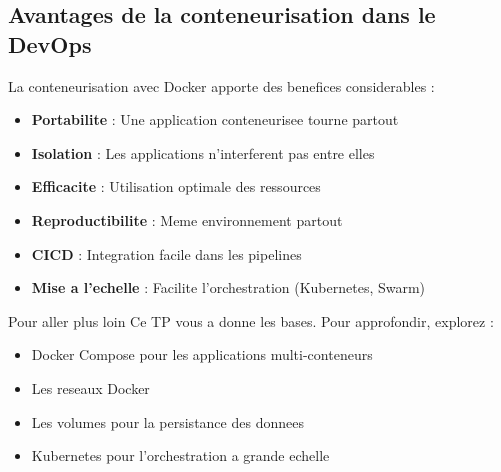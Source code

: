 \documentclass[a4paper,12pt]{article}
\begin{document}
\subsection{Avantages de la conteneurisation dans le DevOps}
La conteneurisation avec Docker apporte des benefices considerables :
\begin{itemize}
    \item \textbf{Portabilite} : Une application conteneurisee tourne partout
    \item \textbf{Isolation} : Les applications n'interferent pas entre elles
    \item \textbf{Efficacite} : Utilisation optimale des ressources
    \item \textbf{Reproductibilite} : Meme environnement partout
    \item \textbf{CICD} : Integration facile dans les pipelines
    \item \textbf{Mise a l'echelle} : Facilite l'orchestration (Kubernetes, Swarm)
\end{itemize}

\begin{importantbox}{Pour aller plus loin}
Ce TP vous a donne les bases. Pour approfondir, explorez :
\begin{itemize}
    \item Docker Compose pour les applications multi-conteneurs
    \item Les reseaux Docker
    \item Les volumes pour la persistance des donnees
    \item Kubernetes pour l'orchestration a grande echelle
\end{itemize}
\end{importantbox}
\end{document}
